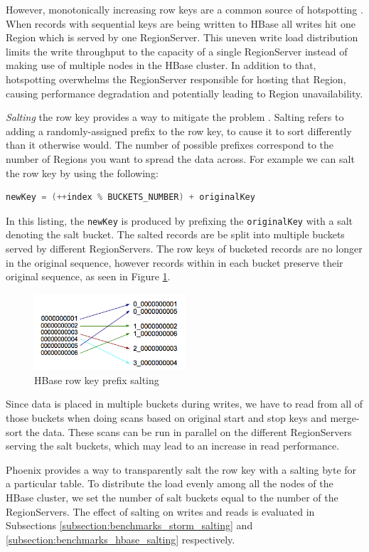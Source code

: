 However, monotonically increasing row keys are a common source of hotspotting \cite{salting_sematext}. When records with sequential keys are being written to HBase all writes hit one Region which is served by one RegionServer. This uneven write load distribution limits the write throughput to the capacity of a single RegionServer instead of making use of multiple nodes in the HBase cluster. In addition to that, hotspotting overwhelms the RegionServer responsible for hosting that Region, causing performance degradation and potentially leading to Region unavailability.

\emph{Salting} the row key provides a way to mitigate the problem \cite{salting_phoenix,salting_sematext}. Salting refers to adding a randomly-assigned prefix to the row key, to cause it to sort differently than it otherwise would. The number of possible prefixes correspond to the number of Regions you want to spread the data across. For example we can salt the row key by using the following:

\begin{lstlisting}[language=C,frame=none]
newKey = (++index % BUCKETS_NUMBER) + originalKey
\end{lstlisting}

In this listing, the \texttt{newKey} is produced by prefixing the \texttt{originalKey} with a salt denoting the salt bucket. The salted records are be split into multiple buckets served by different RegionServers. The row keys of bucketed records are no longer in the original sequence, however records within in each bucket preserve their original sequence, as seen in Figure \ref{figure:optimizations_salting}.

\begin{figure}[h!]
\centering
\includegraphics[width=0.5\textwidth]{figures/optimizations_salting}
\caption{HBase row key prefix salting}
\label{figure:optimizations_salting}
\end{figure}

Since data is placed in multiple buckets during writes, we have to read from all of those buckets when doing scans based on original start and stop keys and merge-sort the data. These scans can be run in parallel on the different RegionServers serving the salt buckets, which may lead to an increase in read performance.

Phoenix provides a way to transparently salt the row key with a salting byte for a particular table. To distribute the load evenly among all the nodes of the HBase cluster, we set the number of salt buckets equal to the number of the RegionServers. The effect of salting on writes and reads is evaluated in Subsections \ref{subsection:benchmarks_storm_salting} and \ref{subsection:benchmarks_hbase_salting} respectively.


\cleardoublepage
